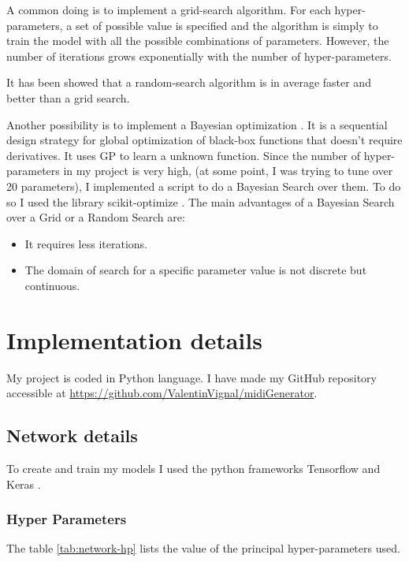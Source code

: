 \documentclass[12pt]{report}
\begin{document}
A common doing is to implement a grid-search algorithm.
For each hyper-parameters, a set of possible value is specified and the algorithm is simply to train the model with all the possible combinations of parameters.
However, the number of iterations grows exponentially with the number of hyper-parameters.

It has been showed that a random-search algorithm is in average faster and better than a grid search.

Another possibility is to implement a Bayesian optimization \cite{frazier_tutorial_2018, adams_tutorial_nodate}.
It is a sequential design strategy for global optimization of black-box functions that doesn't require derivatives.
It uses GP to learn a unknown function.
Since the number of hyper-parameters in my project is very high, (at some point, I was trying to tune over 20 parameters), I implemented a script to do a Bayesian Search over them.
To do so I used the library scikit-optimize \cite{noauthor_scikit-optimize_nodate}.
The main advantages of a Bayesian Search over a Grid or a Random Search are:
\begin{itemize}
    \item It requires less iterations.
    \item The domain of search for a specific parameter value is not discrete but continuous.
\end{itemize}


\section{Implementation details}

My project is coded in Python language.
I have made my GitHub repository accessible at \url{https://github.com/ValentinVignal/midiGenerator}.

\subsection{Network details}

To create and train my models I used the python frameworks Tensorflow \cite{noauthor_tensorflow_nodate} and Keras \cite{noauthor_keras_nodate}.

\subsubsection{Hyper Parameters}

The table \ref{tab:network-hp} lists the value of the principal hyper-parameters used.
\end{document}
